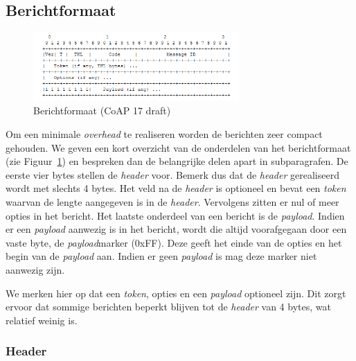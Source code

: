 \subsection{Berichtformaat}
\begin{figure}
\vspace{-20pt}
\includegraphics[width=0.7\textwidth]{fig/CoAPMessageFormat}
\vspace{-30pt}
\caption{Berichtformaat (CoAP 17 draft)}
\vspace{-10pt}
\label{fig:CoAPMessageFormat}
\end{figure}
Om een minimale \textit{overhead} te realiseren worden de berichten zeer compact gehouden. We geven een kort overzicht van de onderdelen van het berichtformaat (zie Figuur~\ref{fig:CoAPMessageFormat}) en bespreken dan de belangrijke delen apart in subparagrafen. De eerste vier bytes stellen de \textit{header} voor. Bemerk dus dat de \textit{header} gerealiseerd wordt met slechts 4 bytes. Het veld na de \textit{header} is optioneel en bevat een \textit{\textit{token}} waarvan de lengte aangegeven is in de \textit{header}. Vervolgens zitten er nul of meer opties in het bericht.
Het laatste onderdeel van een bericht is de \textit{payload}. Indien er een \textit{payload} aanwezig is in het bericht, wordt die altijd voorafgegaan door een vaste byte, de \textit{payload}marker (0xFF). Deze geeft het einde van de opties en het begin van de \textit{payload} aan. Indien er geen \textit{payload} is mag deze marker niet aanwezig zijn.

We merken hier op dat een \textit{token}, opties en een \textit{payload} optioneel zijn. Dit zorgt ervoor dat sommige berichten beperkt blijven tot de \textit{header} van 4 bytes, wat relatief weinig is.

\subsubsection{Header}

